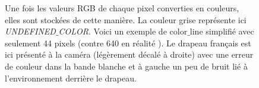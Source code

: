 \documentclass{article}
\begin{document}
    \begin{figure}[!ht] %
        \begin{center}
        \end{center}
        \caption{Une fois les valeurs RGB de chaque pixel converties en couleurs, elles sont stockées de cette manière. La couleur grise représente ici \textit{UNDEFINED$\_$COLOR}. Voici un exemple de \textcolor{bleu}{color$\_$line} simplifié avec seulement 44 pixels (contre 640 en réalité \cite{camera}). Le drapeau français est ici présenté à la caméra (légèrement décalé à droite) avec une erreur de couleur dans la bande blanche et à gauche un peu de bruit lié à l'environnement derrière le drapeau.}
    \end{figure}

    \vspace{5mm}
\end{document}
